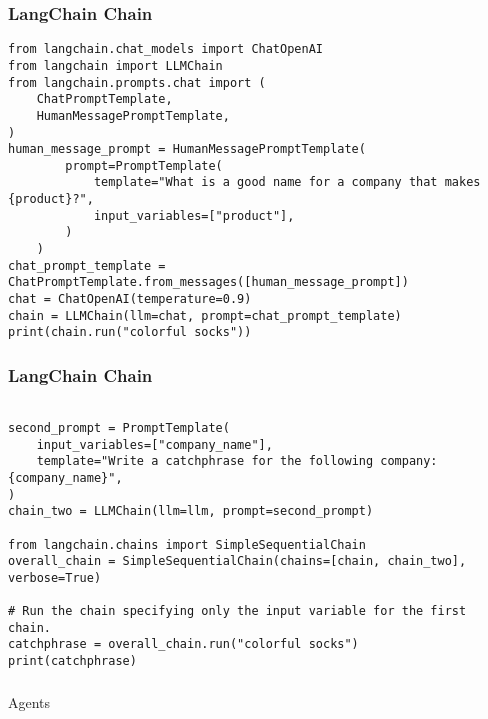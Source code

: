 \begin{frame}[fragile]\frametitle{LangChain Chain}


\begin{lstlisting}
from langchain.chat_models import ChatOpenAI
from langchain import LLMChain
from langchain.prompts.chat import (
    ChatPromptTemplate,
    HumanMessagePromptTemplate,
)
human_message_prompt = HumanMessagePromptTemplate(
        prompt=PromptTemplate(
            template="What is a good name for a company that makes {product}?",
            input_variables=["product"],
        )
    )
chat_prompt_template = ChatPromptTemplate.from_messages([human_message_prompt])
chat = ChatOpenAI(temperature=0.9)
chain = LLMChain(llm=chat, prompt=chat_prompt_template)
print(chain.run("colorful socks"))

\end{lstlisting}	  

\end{frame}


\begin{frame}[fragile]\frametitle{LangChain Chain}


\begin{lstlisting}

second_prompt = PromptTemplate(
    input_variables=["company_name"],
    template="Write a catchphrase for the following company: {company_name}",
)
chain_two = LLMChain(llm=llm, prompt=second_prompt)

from langchain.chains import SimpleSequentialChain
overall_chain = SimpleSequentialChain(chains=[chain, chain_two], verbose=True)

# Run the chain specifying only the input variable for the first chain.
catchphrase = overall_chain.run("colorful socks")
print(catchphrase)
\end{lstlisting}	  

\end{frame}

\begin{frame}[fragile]\frametitle{}
\begin{center}
{\Large Agents}
\end{center}
\end{frame}

